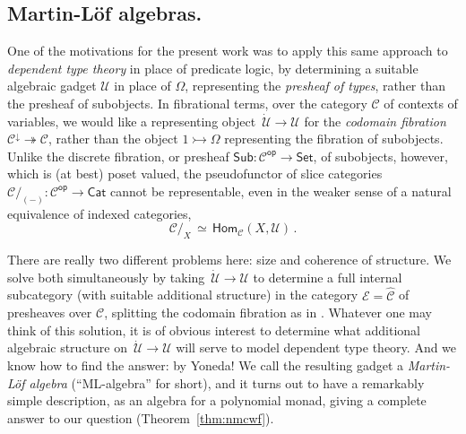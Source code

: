 \documentclass[12pt,reqno]{amsart}
\newcommand{\CC}{\ensuremath{\mathcal{C}}}
\newcommand{\EE}{\ensuremath{\mathcal{E}}}
\newcommand{\op}[1]{\ensuremath{{#1}^{\mathsf{op}}}}
\newcommand{\Set}{\ensuremath{\mathsf{Set}}}
\newcommand{\Hom}{\ensuremath{\mathsf{Hom}}}
\newcommand{\mono}{\ensuremath{\rightarrowtail}}
\renewcommand{\epi}{\ensuremath{\twoheadrightarrow}}
\renewcommand{\to}{\ensuremath{\rightarrow}}
\newcommand{\U}{\ensuremath{\mathcal{U}}}
\newcommand{\UU}{\ensuremath{\,\dot{\mathcal{U}}}}
\theoremstyle{remark}
\theoremstyle{definition}
\begin{document}
\subsection*{Martin-L\"of algebras.} One of the motivations for the present work was to apply this same approach to \emph{dependent type theory} in place of predicate logic, by determining a suitable algebraic gadget $\U$ in place of $\Omega$, representing the \emph{presheaf of types}, rather than the presheaf of subobjects.  In fibrational terms, over the category $\CC$ of contexts of variables, we would like a representing object $\UU \to \U$ for the \emph{codomain fibration} $\CC^\downarrow \epi \CC$, rather than the object $1\mono \Omega$ representing the fibration of subobjects.  Unlike the discrete fibration, or presheaf $\mathsf{Sub} : \op{\CC} \to \Set$, of subobjects, however, which is (at best) poset valued, the pseudofunctor of slice categories $\CC/_{\!(-)} : \op{\CC} \to \mathsf{Cat}$ cannot be representable, even in the weaker sense of a natural equivalence of indexed categories,
\[
\CC/_{X}\, \simeq\, \Hom_{\CC}(X, \U)\,.
\]

There are really two different problems here: size and coherence of structure.  We solve both simultaneously by taking $\UU \to \U$ to determine a full internal subcategory (with suitable additional structure) in the category $\EE = \widehat{\CC}$ of presheaves over $\CC$, splitting the codomain fibration as in \cite{Lums-Warren}.  Whatever one may think of this solution, it is of obvious interest to determine what additional algebraic structure on $\UU \to \U$ will serve to model dependent type theory. And we know how to find the answer: by Yoneda!  We call the resulting gadget a \emph{Martin-L\"of algebra} (``ML-algebra'' for short), and it turns out to have a remarkably simple description, as an algebra for a polynomial monad, giving a complete answer to our question (Theorem~\ref{thm:nmcwf}).
\end{document}
